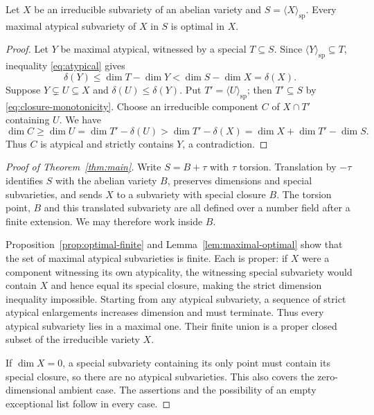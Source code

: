 \begin{lemma}\label{lem:maximal-optimal}
Let $X$ be an irreducible subvariety of an abelian variety and
$S=\langle X\rangle_{\mathrm{sp}}$. Every maximal atypical subvariety
of $X$ in $S$ is optimal in $X$.
\end{lemma}

\begin{proof}
Let $Y$ be maximal atypical, witnessed by a special $T\subseteq S$.
Since $\langle Y\rangle_{\mathrm{sp}}\subseteq T$, inequality
\eqref{eq:atypical} gives
\[
 \delta(Y)\le\dim T-\dim Y
 <\dim S-\dim X=\delta(X).
\]
Suppose $Y\subsetneq U\subseteq X$ and
$\delta(U)\le\delta(Y)$. Put $T'=\langle U\rangle_{\mathrm{sp}}$;
then $T'\subseteq S$ by \eqref{eq:closure-monotonicity}.
Choose an irreducible component $C$ of $X\cap T'$ containing $U$.
We have
\[
 \dim C\ge\dim U
 =\dim T'-\delta(U)
 >\dim T'-\delta(X)
 =\dim X+\dim T'-\dim S.
\]
Thus $C$ is atypical and strictly contains $Y$, a contradiction.
\end{proof}

\begin{proof}[Proof of Theorem~\ref{thm:main}]
Write $S=B+\tau$ with $\tau$ torsion. Translation by $-\tau$ identifies
$S$ with the abelian variety $B$, preserves dimensions and special
subvarieties, and sends $X$ to a subvariety with special closure $B$.
The torsion point, $B$ and this translated subvariety are all defined
over a number field after a finite extension. We may therefore work
inside $B$.

Proposition~\ref{prop:optimal-finite} and
Lemma~\ref{lem:maximal-optimal} show that the set of maximal atypical
subvarieties is finite. Each is proper: if $X$ were a component
witnessing its own atypicality, the witnessing special subvariety
would contain $X$ and hence equal its special closure, making the
strict dimension inequality impossible. Starting from any atypical
subvariety, a sequence of strict atypical enlargements increases
dimension and must terminate. Thus every atypical subvariety lies in a
maximal one. Their finite union is a proper closed subset of the
irreducible variety $X$.

If $\dim X=0$, a special subvariety containing its only point must
contain its special closure, so there are no atypical subvarieties.
This also covers the zero-dimensional ambient case. The assertions
and the possibility of an empty exceptional list follow in every case.
\end{proof}

